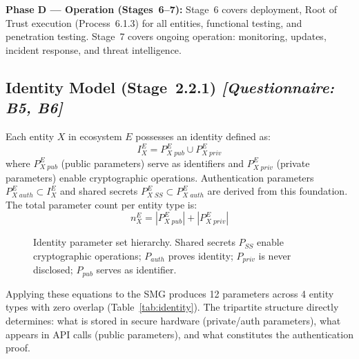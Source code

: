 \documentclass[12pt,a4paper]{article}
\newcommand{\qtag}[1]{\hfill\textcolor{gray!70}{\small\textit{[Questionnaire: #1]}}}
\begin{document}
\textbf{Phase D --- Operation (Stages~6--7):} Stage~6 covers deployment, Root of Trust execution (Process~6.1.3) for all entities, functional testing, and penetration testing. Stage~7 covers ongoing operation: monitoring, updates, incident response, and threat intelligence.

\subsection{Identity Model (Stage~2.2.1) \qtag{B5, B6}}
\label{sec:identity}

Each entity $X$ in ecosystem $E$ possesses an identity defined as:
\begin{equation}
  I^E_X = P^E_{X\;pub} \cup P^E_{X\;priv}
\end{equation}
where $P^E_{X\;pub}$ (public parameters) serve as identifiers and $P^E_{X\;priv}$ (private parameters) enable cryptographic operations. Authentication parameters $P^E_{X\;auth} \subset I^E_X$ and shared secrets $P^E_{X\;SS} \subset P^E_{X\;auth}$ are derived from this foundation. The total parameter count per entity type is:
\begin{equation}
  n^E_X = |P^E_{X\;pub}| + |P^E_{X\;priv}|
\end{equation}

\begin{figure}[htbp]
  \centering
  
  \caption{Identity parameter set hierarchy. Shared secrets $P_{SS}$ enable cryptographic operations; $P_{auth}$ proves identity; $P_{priv}$ is never disclosed; $P_{pub}$ serves as identifier.}
  \label{fig:identidad}
\end{figure}

Applying these equations to the SMG produces 12 parameters across 4 entity types with zero overlap (Table~\ref{tab:identity}). The tripartite structure directly determines: what is stored in secure hardware (private/auth parameters), what appears in API calls (public parameters), and what constitutes the authentication proof.
\end{document}
